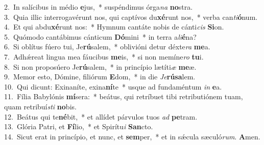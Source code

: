 {2.~}In salícibus in médio \textbf{e}jus,~* suspéndimus órga\textit{na} \textbf{no}stra.\\
{3.~}Quia illic interrogavérunt nos, qui captívos du\textbf{xé}runt nos,~* verba can\textit{ti}\textbf{ó}num.\\
{4.~}Et qui abdu\textbf{xé}runt nos:~* Hymnum cantáte nobis de cánti\textit{cis} \textbf{Si}on.\\
{5.~}Quómodo cantábimus cánticum \textbf{Dó}mini~* in terra a\textit{li}\textbf{é}na?\\
{6.~}Si oblítus fúero tui, Je\textbf{rú}salem,~* oblivióni detur déxte\textit{ra} \textbf{me}a.\\
{7.~}Adhǽreat lingua mea fáucibus \textbf{me}is,~* si non memíne\textit{ro} \textbf{tu}i.\\
{8.~}Si non proposúero Je\textbf{rú}salem,~* in princípio lætíti\textit{æ} \textbf{me}æ.\\
{9.~}Memor esto, Dómine, filiórum \textbf{E}dom,~* in die \textit{Je}\textbf{rú}\textbf{sa}lem.\\
{10.~}Qui dicunt: Exinaníte, exina\textbf{ní}te~* usque ad fundaméntum \textit{in} \textbf{e}a.\\
{11.~}Fília Babylónis \textbf{mí}sera:~* beátus, qui retríbuet tibi retributiónem tuam, quam retribuí\textit{sti} \textbf{no}bis.\\
{12.~}Beátus qui te\textbf{né}bit,~* et allídet párvulos tuos \textit{ad} \textbf{pe}tram.\\
{13.~}Glória Patri, et \textbf{Fí}lio,~* et Spirítu\textit{i} \textbf{San}cto.\\
{14.~}Sicut erat in princípio, et nunc, et \textbf{sem}per,~* et in sǽcula sæculó\textit{rum}. \textbf{A}men.\\
